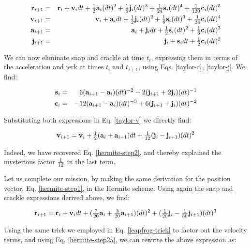 \begin{eqnarray}
\br_{i+1} & = & \br_i + \bv_i dt + \half\ba_{i}(dt)^2 + \one{6}\bj_{i}(dt)^3
                      + \one{24}\bs_{i}(dt)^4 + \one{120}\bc_{i}(dt)^5
                                                           \label{taylor-r} \\
\bv_{i+1} & = & \bv_i + \ba_i dt + \half\bj_{i}(dt)^2 + \one{6}\bs_{i}(dt)^3
                      + \one{24}\bc_{i}(dt)^4              \label{taylor-v} \\
\ba_{i+1} & = & \ba_i + \bj_i dt + \half\bs_{i}(dt)^2 + \one{6}\bc_{i}(dt)^3
                                                           \label{taylor-a} \\
\bj_{i+1} & = & \bj_i + \bs_i dt + \half\bc_{i}(dt)^2      \label{taylor-j}
\end{eqnarray}

\noindent
We can now eliminate snap and crackle at time $t_i$, expressing them
in terms of the acceleration and jerk at times $t_i$ and $t_{i+1}$,
using Eqs. \ref{taylor-a}, \ref{taylor-j}.  We find:

\begin{eqnarray}
{\bf s}_i &=& 6({\bf a}_{i+1} -{\bf a}_{i})(dt)^{-2} -2({\bf j}_{i+1} +2{\bf j}_{i})(dt)^{-1} \\
{\bf c}_i &=& -12({\bf a}_{i+1} -{\bf a}_{i})(dt)^{-3} +6({\bf j}_{i+1} +{\bf j}_{i})(dt)^{-2}
\end{eqnarray}

\noindent
Substituting both expressions in Eq. \ref{taylor-v} we directly find:

\begin{equation}
\bv_{i+1} = \bv_i + \half(\ba_i + \ba_{i+1}) dt +
                \one{12}(\bj_i - \bj_{i+1})(dt)^2 \label{hermite-step2a}
\end{equation}

\noindent
Indeed, we have recovered Eq. \ref{hermite-step2}, and thereby
explained the mysterious factor ${\textstyle\frac{1}{12}}$ in the last term.

Let us complete our mission, by making the same derivation for 
the position vector, Eq. \ref{hermite-step1}, in the Hermite scheme.
Using again the snap and crackle expressions derived above, we find:

\begin{equation}
{\bf r}_{i+1} = {\bf r}_i + {\bf v}_i dt + ({\textstyle\frac{7}{20}}{\bf a}_i + {\textstyle\frac{3}{20}}{\bf a}_{i+1})(dt)^2
            + ({\textstyle\frac{1}{20}}{\bf j}_i - {\textstyle\frac{1}{30}}{\bf j}_{i+1})(dt)^3
\end{equation}

\noindent
Using the same trick we employed in Eq. \ref{leapfrog-trick} to factor
out the velocity terms, and using Eq. \ref{hermite-step2a}, we can
rewrite the above expression as:

